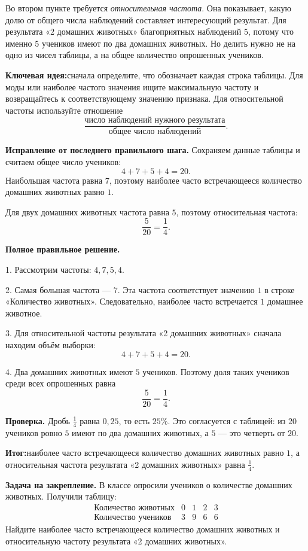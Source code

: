 \documentclass[12pt,a4paper]{article}
\newcommand{\keyidea}{\textcolor{blue!60!black}{\textbf{Ключевая идея:}}}
\newcommand{\outcome}{\textcolor{teal!60!black}{\textbf{Итог:}}}
\begin{document}
Во втором пункте требуется \emph{относительная частота}. Она показывает, какую долю от общего числа наблюдений составляет интересующий результат. Для результата «2 домашних животных» благоприятных наблюдений $5$, потому что именно $5$ учеников имеют по два домашних животных. Но делить нужно не на одно из чисел таблицы, а на общее количество опрошенных учеников.

\keyidea сначала определите, что обозначает каждая строка таблицы. Для моды или наиболее частого значения ищите максимальную частоту и возвращайтесь к соответствующему значению признака. Для относительной частоты используйте отношение
\[
\frac{\text{число наблюдений нужного результата}}{\text{общее число наблюдений}}.
\]

\textbf{Исправление от последнего правильного шага.}
Сохраняем данные таблицы и считаем общее число учеников:
\[
4+7+5+4=20.
\]
Наибольшая частота равна $7$, поэтому наиболее часто встречающееся количество домашних животных равно $1$.

Для двух домашних животных частота равна $5$, поэтому относительная частота:
\[
\frac{5}{20}=\frac14.
\]

\textbf{Полное правильное решение.}

1. Рассмотрим частоты: $4,7,5,4$.

2. Самая большая частота --- $7$. Эта частота соответствует значению $1$ в строке «Количество животных». Следовательно, наиболее часто встречается $1$ домашнее животное.

3. Для относительной частоты результата «2 домашних животных» сначала находим объём выборки:
\[
4+7+5+4=20.
\]

4. Два домашних животных имеют $5$ учеников. Поэтому доля таких учеников среди всех опрошенных равна
\[
\frac{5}{20}=\frac14.
\]

\textbf{Проверка.}
Дробь $\frac14$ равна $0{,}25$, то есть $25\%$. Это согласуется с таблицей: из $20$ учеников ровно $5$ имеют по два домашних животных, а $5$ --- это четверть от $20$.

\outcome наиболее часто встречающееся количество домашних животных равно $1$, а относительная частота результата «2 домашних животных» равна $\frac14$.

\textbf{Задача на закрепление.}
В классе опросили учеников о количестве домашних животных. Получили таблицу:
\[
\begin{array}{c|cccc}
\text{Количество животных} & 0 & 1 & 2 & 3 \\
\hline
\text{Количество учеников} & 3 & 9 & 6 & 6
\end{array}
\]
Найдите наиболее часто встречающееся количество домашних животных и относительную частоту результата «2 домашних животных».
\end{document}
